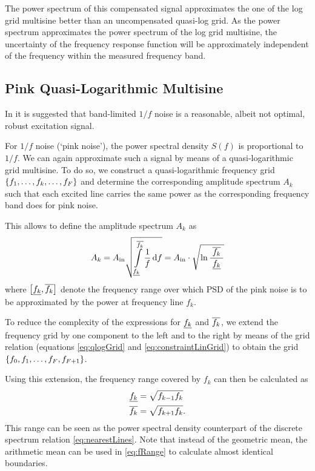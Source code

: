   The power spectrum of this compensated signal approximates the one of the log grid multisine better than an uncompensated quasi-log grid.
  As the power spectrum approximates the power spectrum of the log grid multisine, the uncertainty of the frequency response function will be approximately independent of the frequency within the measured frequency band.

  \subsection{Pink Quasi-Logarithmic Multisine}
  In \citep{Rojas2007} it is suggested that band-limited $1/f$ noise is a reasonable, albeit not optimal, robust excitation signal.

  For $1/f$ noise (`pink noise'), the power spectral density $S(f)$ is proportional to $1/f$.
  We can again approximate such a signal by means of a quasi-logarithmic grid multisine.
  To do so, we construct a quasi-logarithmic frequency grid $\left\{f_1,\ldots,f_k,\ldots,f_F\right\}$ and determine the corresponding amplitude spectrum $A_k$ such that each excited line carries the same power as the corresponding frequency band does for pink noise.

  This allows to define the amplitude spectrum $A_k$ as
  \begin{equation}
    A_k = A_{\mathrm{in}}
                 \sqrt{\int_{\underline{f_{k}}}
                     ^{\overline{f_{k}}}
                     \limits
                     \frac{1}
                          {f}
                     \,\mathrm{d}{f}}
          = A_{\mathrm{in}}
                \cdot
                \sqrt{
                \ln \frac{\;\overline{f_{k}}\;}{\underline{f_{k}}}
                }
  \end{equation}
  where $\left[ \underline{f_{k}}, \overline{f_{k}} \right] $ denote the frequency range over which PSD of the pink noise is to be approximated by the power at frequency line $f_k$.

  To reduce the complexity of the expressions for $\underline{f_{k}}$ and $\overline{f_{k}}$, we extend the frequency grid by one component to the left and to the right by means of the grid relation (equations \eqref{eq:qlogGrid} and \eqref{eq:constraintLinGrid}) to obtain the grid $\left\{f_0, f_1, \ldots, f_F, f_{F+1}\right\}$.

  Using this extension, the frequency range covered by $f_k$ can then be calculated as
    \begin{align}
      \underline{f_{k}} &= \sqrt{f_{k-1} f_k}\\
      \overline{f_{k}} &= \sqrt{f_{k+1} f_k}
    \label{eq:fRange}
    \text{.}
    \end{align}
  This range can be seen as the power spectral density counterpart of the discrete spectrum relation \eqref{eq:nearestLines}.
  Note that instead of the geometric mean, the arithmetic mean can be used in \eqref{eq:fRange} to calculate almost identical boundaries.

